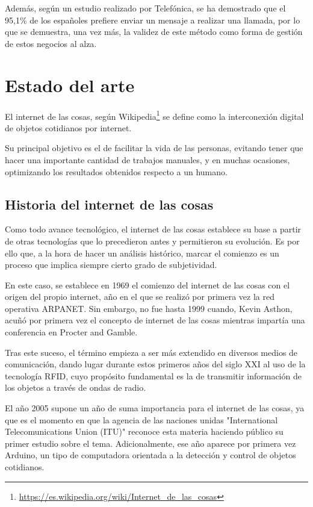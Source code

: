 Además, según un estudio \cite{samuelfernandez2019} realizado por Telefónica, se ha demostrado que el 95,1\% de los españoles prefiere enviar un mensaje a realizar una llamada, por lo que se demuestra, una vez más, la validez de este método como forma de gestión de estos negocios al alza.

\section{Estado del arte}

\noindent El internet de las cosas, según Wikipedia\footnote{\url{https://es.wikipedia.org/wiki/Internet_de_las_cosas}} se define como la interconexión digital de objetos cotidianos por internet.

Su principal objetivo es el de facilitar la vida de las personas, evitando tener que hacer una importante cantidad de trabajos manuales, y en muchas ocasiones, optimizando los resultados obtenidos respecto a un humano.

\subsection{Historia del internet de las cosas}

\noindent Como todo avance tecnológico, el internet de las cosas establece su base a partir de otras tecnologías que lo precedieron antes y permitieron su evolución. Es por ello que, a la hora de hacer un análisis histórico, marcar el comienzo es un proceso que implica siempre cierto grado de subjetividad.

En este caso, se establece en 1969 el comienzo del internet de las cosas con el origen del propio internet, año en el que se realizó por primera vez la red operativa ARPANET\cite{tibipuiu2020}. Sin embargo, no fue hasta 1999 cuando, Kevin Asthon, acuñó por primera vez el concepto de internet de las cosas mientras impartía una conferencia en Procter and Gamble.

Tras este suceso, el término empieza a ser más extendido en diversos medios de comunicación, dando lugar durante estos primeros años del siglo XXI al uso de la tecnología RFID\cite{sorayapa2012}, cuyo propósito fundamental es la de transmitir información de los objetos a través de ondas de radio.

El año 2005 supone un año de suma importancia para el internet de las cosas, ya que es el momento en que la agencia de las naciones unidas "International Telecomunications Union (ITU)" reconoce esta materia haciendo público su primer estudio sobre el tema. Adicionalmente, ese año aparece por primera vez Arduino, un tipo de computadora orientada a la detección y control de objetos cotidianos.

